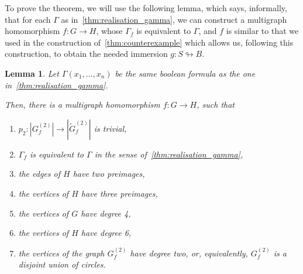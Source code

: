 \documentclass[a4paper,12pt,reqno,oneside]{amsart}
\theoremstyle{plain}
\newtheorem{lemma}{Lemma}
\theoremstyle{definition}
\theoremstyle{plain}
\newcommand{\from}{\colon}
\newcommand{\wt}[1]{\widetilde{#1}}
\begin{document}
To prove the theorem, we will use the following lemma, which says, informally, that for each
$\Gamma$ as in~\cref{thm:realisation_gamma}, we can construct a multigraph homomorphism
$f \from G \to H$, whose $\Gamma_f$ is equivalent to $\Gamma$, and $f$ is similar to that we used in
the construction of~\cref{thm:counterexample} which allows us, following this construction, to
obtain the needed immersion $g \from S \looparrowright B$.

\begin{lemma}\label{lemma:realisation}
  Let $\Gamma(x_1, \dots, x_n)$ be the same boolean formula as the one in~\cref{thm:realisation_gamma}.

  Then, there is a multigraph homomorphism $f \from G \to H$, such that
  \begin{enumerate}
  \item $p_2 \from |G^{(2)}_f| \to |\wt{G}^{(2)}_f|$ is trivial,
  \item $\Gamma_f$ is equivalent to $\Gamma$ in the sense of~\cref{thm:realisation_gamma},
  \item the edges of $H$ have two preimages,
  \item the vertices of $H$ have three preimages,
  \item the vertices of $G$ have degree 4,
  \item the vertices of $H$ have degree 6,
  \item the vertices of the graph $G^{(2)}_f$ have degree two, or, equivalently, $G^{(2)}_f$ is a disjoint
    union of circles.
  \end{enumerate}
\end{lemma}
\end{document}
